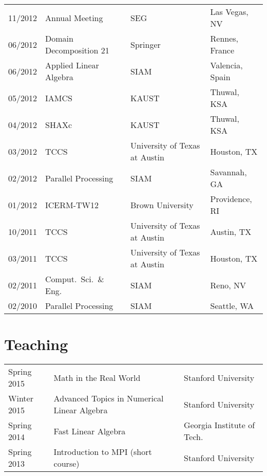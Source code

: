 \documentclass[letterpaper]{article}
\renewenvironment{itemize}{
  \begin{list}{}{
    \setlength{\leftmargin}{1.5em}
  }
}{
  \end{list}
}
\begin{document}
\begin{tabular}{rlll}
11/2012 & Annual Meeting                  & SEG                           & Las Vegas, NV \\
06/2012 & Domain Decomposition 21         & Springer                      & Rennes, France \\
06/2012 & Applied Linear Algebra          & SIAM                          & Valencia, Spain \\
05/2012 & IAMCS                           & KAUST                         & Thuwal, KSA \\
04/2012 & SHAXc                           & KAUST                         & Thuwal, KSA \\
03/2012 & TCCS                            & University of Texas at Austin & Houston, TX \\
02/2012 & Parallel Processing             & SIAM                          & Savannah, GA \\
01/2012 & ICERM-TW12                      & Brown University              & Providence, RI \\
10/2011 & TCCS                            & University of Texas at Austin & Austin, TX \\
03/2011 & TCCS                            & University of Texas at Austin & Houston, TX \\
02/2011 & Comput.\ Sci.\ \& Eng.\         & SIAM                          & Reno, NV \\
02/2010 & Parallel Processing             & SIAM                          & Seattle, WA \\
\end{tabular}

\section*{Teaching}
\begin{tabular}{lll}
Spring 2015 & Math in the Real World                      & Stanford University \\
Winter 2015 & Advanced Topics in Numerical Linear Algebra & Stanford University \\
Spring 2014 & Fast Linear Algebra                         & Georgia Institute of Tech.\ \\
Spring 2013 & Introduction to MPI (short course)          & Stanford University \\
\end{tabular}

\end{document}
